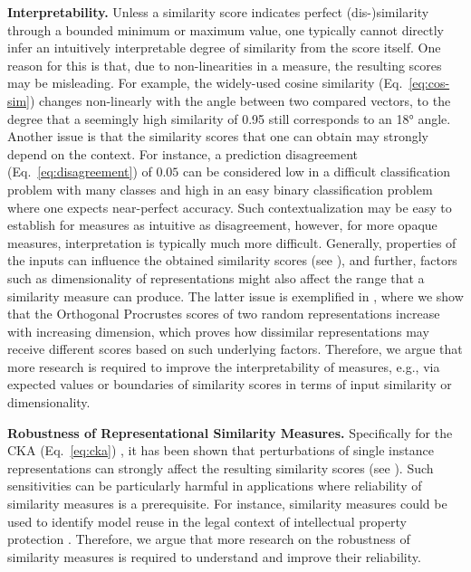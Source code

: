 \documentclass{article}
\newcommand\myeqref[1]{%
    (\textup{Eq.~\ref{#1}})%
}
\newcommand{\subheader}{\textbf}
\begin{document}
\subheader{Interpretability.} %
Unless a similarity score indicates perfect (dis-)similarity through a bounded minimum or maximum value, one typically cannot directly infer an intuitively interpretable degree of similarity from the score itself.
One reason for this is that, due to non-linearities in a measure, the resulting scores may be misleading.
For example, the widely-used cosine similarity \myeqref{eq:cos-sim} changes non-linearly with the angle between two compared vectors, to the degree that a seemingly high similarity of 0.95 still corresponds to an 18° angle.
Another issue is that the similarity scores that one can obtain may strongly depend on the context.
For instance, a prediction disagreement \myeqref{eq:disagreement} of $0.05$ can be considered low in a difficult classification problem with many classes and high in an easy binary classification problem where one expects near-perfect accuracy.
Such contextualization may be easy to establish for measures as intuitive as disagreement, however, for more opaque measures, interpretation is typically much more difficult.
Generally, properties of the inputs can influence the obtained similarity scores (see ), and further, factors such as dimensionality of representations might also affect the range that a similarity measure can produce.
The latter issue is exemplified in , where we show that the Orthogonal Procrustes scores of two random representations increase with increasing dimension, which proves how dissimilar representations may receive different scores based on such underlying factors.
Therefore, we argue that more research is required to improve the interpretability of measures, e.g., via expected values or boundaries of similarity scores in terms of input similarity or dimensionality.


\subheader{Robustness of Representational Similarity Measures.}
Specifically for the CKA \myeqref{eq:cka}, it has been shown that perturbations of single instance representations can strongly affect the resulting similarity scores (see ).
Such sensitivities can be particularly harmful in applications where reliability of similarity measures is a prerequisite.
For instance, similarity measures could be used to identify model reuse in the legal context of intellectual property protection \cite{sun_deep_2023}.
Therefore, we argue that more research on the robustness of similarity measures is required to understand and improve their reliability.
\end{document}
